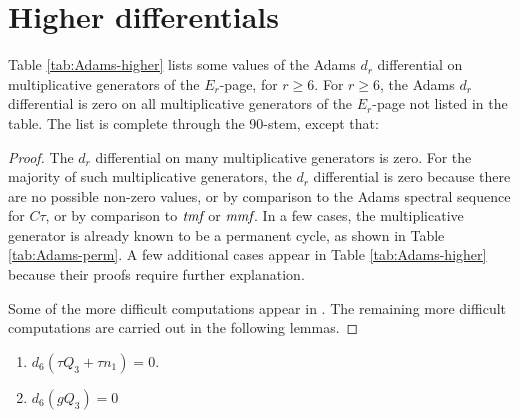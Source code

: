 \section{Higher differentials}
\label{sctn:Adams-higher}


\begin{thm}
\label{thm:Adams-higher}
Table \ref{tab:Adams-higher} lists some values of the
Adams $d_r$ differential on multiplicative generators of the
$E_r$-page, for $r \geq 6$.
For $r \geq 6$, 
the Adams $d_r$ differential is zero on all multiplicative
generators of the $E_r$-page not listed in the table.
The list is complete through the 90-stem, except that:
\end{thm}

\begin{proof}
The $d_r$ differential on many multiplicative generators is zero.
For the majority of such multiplicative generators,
the $d_r$ differential is zero
because there are no possible non-zero
values, or by comparison to the Adams spectral sequence for $C\tau$,
or by comparison to $\textit{tmf}$ or $\textit{mmf}$.
In a few cases, the multiplicative generator
is already known to be a permanent cycle, as shown in 
Table \ref{tab:Adams-perm}.
A few additional cases appear
in Table \ref{tab:Adams-higher} because their proofs require further
explanation.

Some of the more difficult computations appear in \cite{BIX}.
The remaining more difficult computations are carried out in the
following lemmas.
\end{proof}


\begin{lemma}
\label{lem:d6-tQ3+tn1}
\mbox{}
\begin{enumerate}
\item
{}
$d_6(\tau Q_3 + \tau n_1) = 0$.
\item
{}
$d_6(g Q_3) = 0$
\end{enumerate}
\end{lemma}

